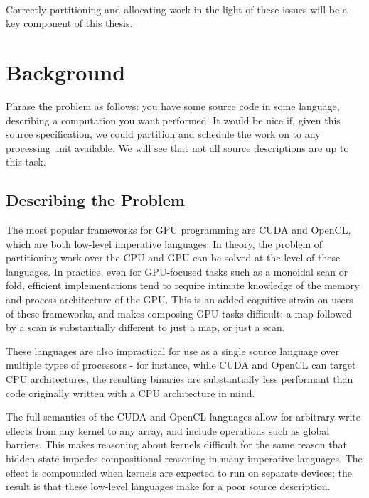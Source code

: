\documentclass[a4paper,12pt]{article}
\begin{document}
\paragraph*{}
Correctly partitioning and allocating work in the light of these issues will be a key component of this thesis.

\section{Background}
Phrase the problem as follows: you have some source code in some language, describing a computation you want performed. 
It would be nice if, given this source specification, we could partition and schedule the work on to any processing unit available. 
We will see that not all source descriptions are up to this task.

\subsection{Describing the Problem}
The most popular frameworks for GPU programming are CUDA and OpenCL, which are both low-level imperative languages. 
In theory, the problem of partitioning work over the CPU and GPU can be solved at the level of these languages. 
In practice, even for GPU-focused tasks such as a monoidal scan or fold, efficient implementations tend to require intimate knowledge of the memory and process architecture of the GPU. 
This is an added cognitive strain on users of these frameworks, and makes composing GPU tasks difficult: a map followed by a scan is substantially different to just a map, or just a scan.

These languages are also impractical for use as a single source language over multiple types of processors - for instance, while CUDA and OpenCL can target CPU architectures, the resulting binaries are substantially less performant than code originally written with a CPU architecture in mind.

The full semantics of the CUDA and OpenCL languages allow for arbitrary write-effects from any kernel to any array, and include operations such as global barriers. 
This makes reasoning about kernels difficult for the same reason that hidden state impedes compositional reasoning in many imperative languages. 
The effect is compounded when kernels are expected to run on separate devices; the result is that these low-level languages make for a poor source description.
\end{document}
